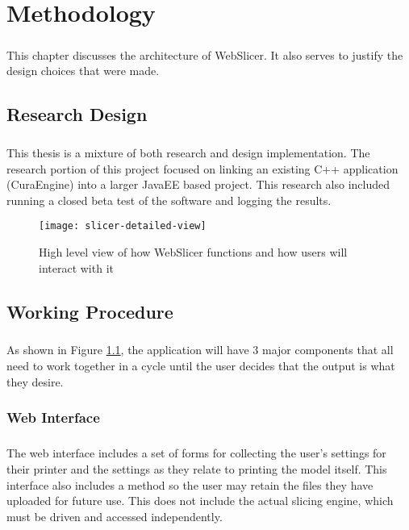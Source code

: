\chapter{Methodology}
\paragraph{}
This chapter discusses the architecture of WebSlicer. It also serves to justify the design choices that were made. 

\section{Research Design} 
\paragraph{}
This thesis is a mixture of both research and design implementation.
The research portion of this project focused on linking an existing C++ application (CuraEngine) into a larger JavaEE based project.
This research also included running a closed beta test of the software and logging the results.

\begin{figure}[!ht]
  \centering
  \texttt{[image: slicer-detailed-view]}
  \caption{High level view of how WebSlicer functions and how users will interact with it}
  \label{fig:slicer-detailed-view}
\end{figure}

\section{Working Procedure}
\paragraph{}
As shown in Figure \ref{fig:slicer-detailed-view}, the application will have 3 major components that all need to work together in a cycle until the user decides that the output is what they desire.

\subsection{Web Interface}
\paragraph{}
The web interface includes a set of forms for collecting the user's settings for their printer and the settings as they relate to printing the model itself.
This interface also includes a method so the user may retain the files they have uploaded for future use.
This does not include the actual slicing engine, which must be driven and accessed independently.

